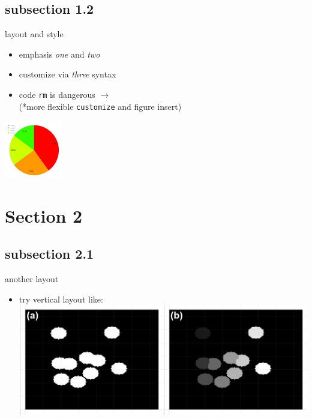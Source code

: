 \documentclass[11pt]{beamer}
\newcommand{\code}[1]{\texttt{#1}}
\begin{document}
\subsection{subsection 1.2}
\begin{frame}{layout and style}
    \begin{minipage}[t]{0.5\textwidth}
        \vspace{0pt}
        \begin{itemize}
            \item emphasis \emph{one} and \emph{two}
            \item customize via \emph{\color{red}three} syntax
            \item code \code{rm} is dangerous $\rightarrow$ \\ {\footnotesize\color{olive}(*more flexible \code{customize} and figure insert)}
        \end{itemize}
    \end{minipage}%
    \hfill
    \begin{minipage}[t]{0.45\textwidth}
        \vspace{0pt}
        \centering
        \includegraphics[height=2.5cm, width=2.5cm]{fig1.jpg}
    \end{minipage}
\end{frame}

\section{Section 2}
\subsection{subsection 2.1}
\begin{frame}[t]{another layout}
	\begin{minipage}[t]{1\textwidth}
        \vspace{0pt}
        \begin{itemize}
            \item {try vertical layout like:}\\
            \singlespacing
            \centering
            \includegraphics[scale=0.5]{fig2.jpg}
        \end{itemize}
    \end{minipage}%
\end{frame}
\end{document}
